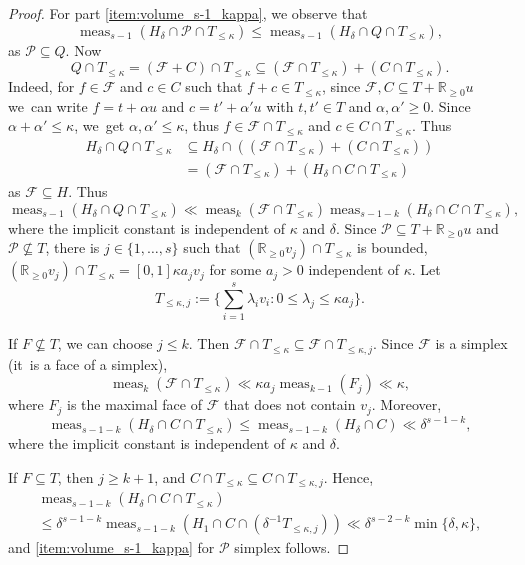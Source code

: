 \documentclass[JEP,XML,SOM,Unicode,published]{cedram}
\newcommand\RR{\mathbb{R}}
\DeclareMathOperator{\meas}{meas}
\theoremstyle{definition}
\numberwithin{theorem}{section}
\begin{document}
\begin{proof}
For part \eqref{item:volume_s-1_kappa}, we observe that
\[
\meas_{s-1}(H_\delta\cap\mathcal P\cap T_{\leq\kappa}) \leq \meas_{s-1}(H_{\delta}\cap Q\cap T_{\leq\kappa}),
\]
as $\mathcal P\subseteq Q$.
Now
\[
Q\cap T_{\leq\kappa}= (\mathcal F+C)\cap T_{\leq\kappa}\subseteq(\mathcal F\cap T_{\leq\kappa}) + (C\cap T_{\leq\kappa}).
\]
Indeed, for $f\in \mathcal F$ and $c\in C$ such that $f+c\in T_{\leq\kappa}$, since $\mathcal F, C\subseteq T+\RR_{\geq0}u$ we~can write $f=t+\alpha u$ and $c=t'+\alpha'u$ with $t,t'\in T$ and $\alpha,\alpha'\geq 0$. Since $\alpha+\alpha'\leq \kappa$, we~get $\alpha,\alpha'\leq\kappa$, thus $f\in\mathcal F\cap T_{\leq\kappa}$ and $c\in C\cap T_{\leq\kappa}$. Thus
\begin{equation}\label{eq:volume:decomposition}
\begin{aligned}
H_{\delta}\cap Q\cap T_{\leq\kappa}
&\subseteq H_\delta\cap ((\mathcal F\cap T_{\leq\kappa}) + (C\cap T_{\leq\kappa}))\\
&= (\mathcal F\cap T_{\leq\kappa}) + (H_\delta\cap C\cap T_{\leq\kappa})
\end{aligned}
\end{equation}
as $\mathcal F\subseteq H$.
Thus
\[
\meas_{s-1}(H_{\delta}\cap Q\cap T_{\leq\kappa})
\ll \meas_k(\mathcal F\cap T_{\leq\kappa})
\meas_{s-1-k}(H_{\delta}\cap C\cap T_{\leq\kappa}),
\]
where the implicit constant is independent of $\kappa$ and $\delta$.
Since $\mathcal P\subseteq T+\RR_{\geq0} u$ and $\mathcal P\nsubseteq T$,
there is $j\in\{1,\dots,s\}$
such that $(\RR_{\geq0} v_{j})\cap T_{\leq\kappa}$ is bounded, \ie $(\RR_{\geq0} v_{j})\cap T_{\leq\kappa}=[0,1]\kappa a_{j}v_{j}$ for some
$a_{j}>0$ independent of $\kappa$.
Let \[
T_{\leq\kappa, j}:=\biggl \{\sum_{i=1}^s\lambda_i v_i:0\leq \lambda_{j}\leq \kappa a_{j} \biggr \}.
\]

If $F\not\subseteq T$, we can choose $j\leq k$. Then
$\mathcal F\cap T_{\leq\kappa}
\subseteq \mathcal F\cap T_{\leq\kappa, j}$.
Since $\mathcal F$ is a simplex (it~is a face of a simplex),
\[
\meas_k(\mathcal F\cap T_{\leq\kappa})
\ll \kappa a_{j}\meas_{k-1}(F_{j})\ll\kappa,
\]
where $F_{j}$ is the maximal face of $\mathcal F$ that does not contain $v_{j}$.
Moreover, \[
\meas_{s-1-k}(H_\delta \cap C\cap T_{\leq\kappa})
\leq \meas_{s-1-k}(H_\delta \cap C)\ll \delta^{s-1-k},
\]
where the implicit constant is independent of $\kappa$ and $\delta$.

If $F\subseteq T$, then $j\geq k+1$, and $C\cap T_{\leq\kappa} \subseteq C\cap T_{\leq\kappa, j}$.
Hence, \begin{multline*}
\meas_{s-1-k}(H_\delta\cap C\cap T_{\leq\kappa}) \\
\leq\delta^{s-1-k}\meas_{s-1-k}(H_1\cap C\cap (\delta^{-1}T_{\leq\kappa,j}))
\ll \delta^{s-2-k}\min\{\delta,\kappa\},
\end{multline*}
and \eqref{item:volume_s-1_kappa} for $\mathcal P$ simplex follows.


\end{proof}
\end{document}
